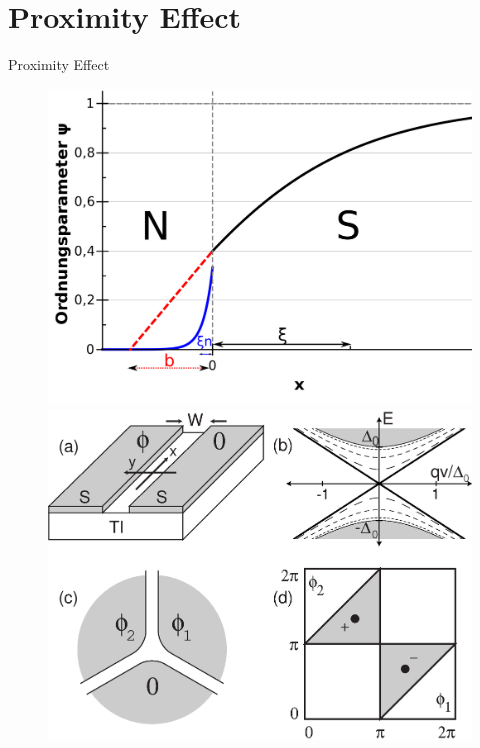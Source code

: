\documentclass[10pt,aspectratio=169]{beamer} %
\begin{document}
\section{Proximity Effect}
\begin{frame}{Proximity Effect}
\begin{figure}[h]
\flushleft
\includegraphics[scale=0.15]{pic/pro}
\includegraphics[scale=0.35]{pic/fig5}\label{fig5}
\end{figure}	
\end{frame}
\end{document}
